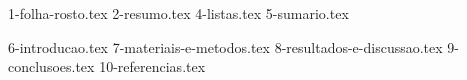 \documentclass{relatorioic}
\begin{document}
{1-folha-rosto.tex}
{2-resumo.tex}
{4-listas.tex}
{5-sumario.tex}

{6-introducao.tex}
{7-materiais-e-metodos.tex}
{8-resultados-e-discussao.tex}
{9-conclusoes.tex}
{10-referencias.tex}
\end{document}
